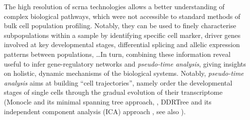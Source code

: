 The high resolution of \acrshort{scrna} technologies allows a better understanding of complex biological pathways, which were not accessible to standard methods of bulk cell population profiling. Notably, they can be used to finely characterise subpopulations within a sample by identifying specific \gls{cell marker}, driver genes involved at key developmental stages, differential splicing and allelic expression patterns between populations, \ldots In turn, combining these information reveal useful to infer gene-regulatory networks and \emph{pseudo-time analysis}, giving insights on holistic, dynamic mechanisms of the biological systems. Notably, \emph{pseudo-time analysis} aims at building \enquote{cell trajectories}, namely order the developmental stages of single cells through the gradual evolution of their transcriptome (Monocle and its minimal spanning tree approach, \autocite{trapnell_etal14}, DDRTree and its independent component analysis (ICA) approach \autocite{qiu_etal17}, see also ). 

